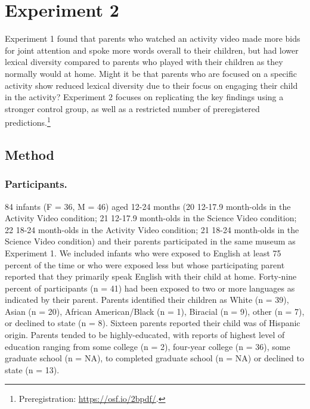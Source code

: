 \documentclass[man,floatsintext]{apa6}
\begin{document}
\hypertarget{experiment-2}{%
\section{Experiment 2}\label{experiment-2}}

Experiment 1 found that parents who watched an activity video made more bids for joint attention and spoke more words overall to their children, but had lower lexical diversity compared to parents who played with their children as they normally would at home.
Might it be that parents who are focused on a specific activity show reduced lexical diversity due to their focus on engaging their child in the activity?
Experiment 2 focuses on replicating the key findings using a stronger control group, as well as a restricted number of preregistered predictions.\footnote{Preregistration: \href{https://osf.io/2bpdf}{https://osf.io/2bpdf/}.}

\hypertarget{method-1}{%
\subsection{Method}\label{method-1}}

\hypertarget{participants.-1}{%
\subsubsection{Participants.}\label{participants.-1}}

84 infants (F = 36, M = 46) aged 12-24 months
(20 12-17.9 month-olds in the Activity Video condition;
21 12-17.9 month-olds in the Science Video condition;
22 18-24 month-olds in the Activity Video condition;
21 18-24 month-olds in the Science Video condition) and their parents participated in the same museum as Experiment 1.
We included infants who were exposed to English at least 75 percent of the time or who were exposed less but whose participating parent reported that they primarily speak English with their child at home.
Forty-nine percent of participants (n = 41) had been exposed to two or more languages as indicated by their parent.
Parents identified their children as White (n = 39), Asian (n = 20), African American/Black (n = 1), Biracial (n = 9), other (n = 7), or declined to state (n = 8).
Sixteen parents reported their child was of Hispanic origin.
Parents tended to be highly-educated, with reports of highest level of education ranging from some college (n = 2), four-year college (n = 36), some graduate school (n = NA), to completed graduate school (n = NA) or declined to state (n = 13).
\end{document}
